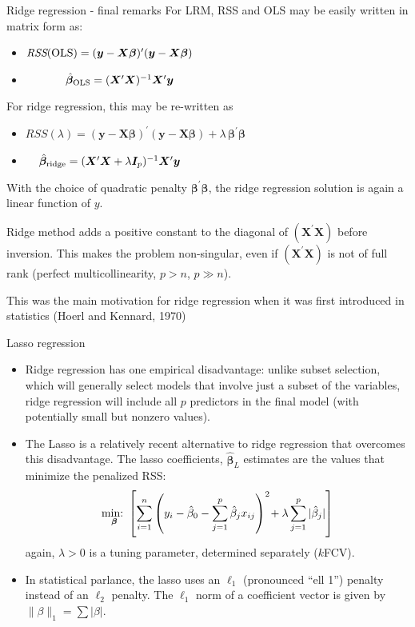 \documentclass{beamer}
\begin{document}
\begin{frame}{Ridge regression - final remarks}
For LRM, RSS and OLS may be easily written in matrix form as:
\begin{itemize}
\item $\textit{RSS}(\textnormal{OLS}) = (\bm{y}-\bm{X\beta})^{\prime}(\bm{y}-\bm{X\beta})$
\item ~~~~~~~$\hat{\bm{\beta}}_{\textnormal{OLS}} = (\bm{X}^{\prime}\bm{X})^{-1}\bm{X}^{\prime}\bm{y}$ 
\end{itemize}
For ridge regression, this may be re-written as
\begin{itemize}
\item $\textit{RSS}(\lambda) = (\bm{y}-\bm{X\beta})^{\prime}(\bm{y}-\bm{X\beta}) 
+ \lambda \,\bm{\beta}^{\prime} \!\bm{\beta}$
\item ~~$\,\hat{\bm{\beta}}_{\textnormal{ridge}} = (\bm{X}^{\prime}\bm{X} + \lambda \bm{I}_p )^{-1}\bm{X}^{\prime}\bm{y}$ 
\end{itemize}

With the choice of quadratic penalty $\bm{\beta}^{\prime} \!\bm{\beta}$, the ridge regression solution is again a linear function of $y$. 

\medskip
Ridge method adds a positive constant to the diagonal of $(\bm{X}^{\prime}\bm{X})$ before inversion. This makes the problem non-singular, even if $(\bm{X}^{\prime}\bm{X})$ is not of full rank (perfect multicollinearity, $p>n$, $p \gg n$).

\medskip
This was the main motivation for ridge regression when it was first introduced in statistics (Hoerl and Kennard, 1970)

\end{frame}
\begin{frame}{Lasso regression}
\begin{itemize}
\item Ridge regression has one empirical disadvantage:
unlike subset selection, which will generally select models
that involve just a subset of the variables, ridge regression
will include all $p$ predictors in the final model (with potentially small but nonzero values).
\medskip
\item The Lasso is a relatively recent alternative to ridge
regression that overcomes this disadvantage. The lasso
coefficients,  $\bm{\hat{\beta}}_{\!L}$ estimates 
are the values that minimize the penalized RSS:
$$
\underset{\bm{\beta}}{\textnormal{min:~}} 
\left[
\sum_{i=1}^n \left(y_i - \hat{\beta}_0 
- \sum_{j=1}^p  \hat{\beta}_j x_{ij} \right)^2 
\! + \lambda \sum_{j=1}^p  | \hat{\beta}_j | \right]$$
again, $\lambda > 0$ is a tuning parameter, determined separately ($k$FCV).
\item In statistical parlance, the lasso uses an $\ell_1$ (pronounced ``ell 1'') penalty instead of an $\ell_2$ penalty. The $\ell_1$ norm of a coefficient vector  is given by 
$\| \beta \|_1 = \sum | \beta |$.
\end{itemize}
\end{frame}
\end{document}
